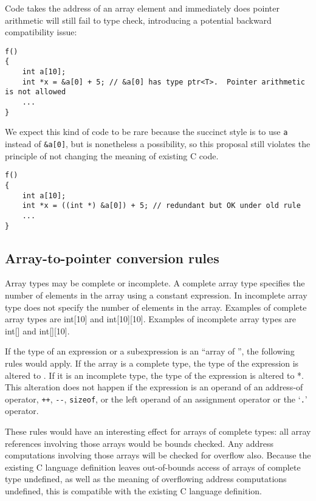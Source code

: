 Code takes the address of an array element and immediately does pointer
arithmetic will still fail to type check, introducing a potential
backward compatibility issue:
\begin{verbatim}
f()
{
    int a[10];
    int *x = &a[0] + 5; // &a[0] has type ptr<T>.  Pointer arithmetic is not allowed
    ...
}
\end{verbatim}

We expect this kind of code to be rare because the succinct style is to
use \texttt{a} instead of \texttt{\&a[0]}, but is nonetheless a
possibility, so this proposal still violates the principle of not
changing the meaning of existing C code.

\begin{verbatim}
f()
{
    int a[10];
    int *x = ((int *) &a[0]) + 5; // redundant but OK under old rule
    ...
}
\end{verbatim}

\subsection{Array-to-pointer conversion rules}

Array types may be complete or incomplete. A complete array type
specifies the number of elements in the array using a constant
expression. In incomplete array type does not specify the number of
elements in the array. Examples of complete array types are int[10]
and int[10][10]. Examples of incomplete array types are
int[] and int[][10].

If the type of an expression or a subexpression is an ``array of
'', the following rules would apply. If the array is a complete
type, the type of the expression is altered to
\arrayptrT . If it is
an incomplete type, the type of the expression is altered to  *.
This alteration does not happen if the expression is an operand of an
address-of operator, \texttt{++}, \texttt{-\/-}, \texttt{sizeof}, or the
left operand of an assignment operator or the `\texttt{.}' operator.

These rules would have an interesting effect for arrays of complete
types: all array references involving those arrays would be bounds
checked. Any address computations involving those arrays will be checked
for overflow also. Because the existing C language definition leaves
out-of-bounds access of arrays of complete type undefined, as well as
the meaning of overflowing address computations undefined, this is
compatible with the existing C language definition.

